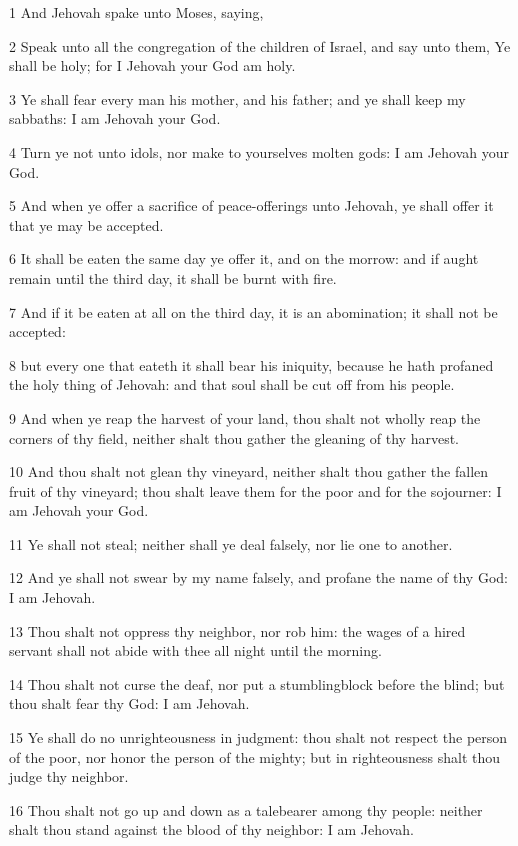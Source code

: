 \par 1 And Jehovah spake unto Moses, saying,
\par 2 Speak unto all the congregation of the children of Israel, and say unto them, Ye shall be holy; for I Jehovah your God am holy.
\par 3 Ye shall fear every man his mother, and his father; and ye shall keep my sabbaths: I am Jehovah your God.
\par 4 Turn ye not unto idols, nor make to yourselves molten gods: I am Jehovah your God.
\par 5 And when ye offer a sacrifice of peace-offerings unto Jehovah, ye shall offer it that ye may be accepted.
\par 6 It shall be eaten the same day ye offer it, and on the morrow: and if aught remain until the third day, it shall be burnt with fire.
\par 7 And if it be eaten at all on the third day, it is an abomination; it shall not be accepted:
\par 8 but every one that eateth it shall bear his iniquity, because he hath profaned the holy thing of Jehovah: and that soul shall be cut off from his people.
\par 9 And when ye reap the harvest of your land, thou shalt not wholly reap the corners of thy field, neither shalt thou gather the gleaning of thy harvest.
\par 10 And thou shalt not glean thy vineyard, neither shalt thou gather the fallen fruit of thy vineyard; thou shalt leave them for the poor and for the sojourner: I am Jehovah your God.
\par 11 Ye shall not steal; neither shall ye deal falsely, nor lie one to another.
\par 12 And ye shall not swear by my name falsely, and profane the name of thy God: I am Jehovah.
\par 13 Thou shalt not oppress thy neighbor, nor rob him: the wages of a hired servant shall not abide with thee all night until the morning.
\par 14 Thou shalt not curse the deaf, nor put a stumblingblock before the blind; but thou shalt fear thy God: I am Jehovah.
\par 15 Ye shall do no unrighteousness in judgment: thou shalt not respect the person of the poor, nor honor the person of the mighty; but in righteousness shalt thou judge thy neighbor.
\par 16 Thou shalt not go up and down as a talebearer among thy people: neither shalt thou stand against the blood of thy neighbor: I am Jehovah.
